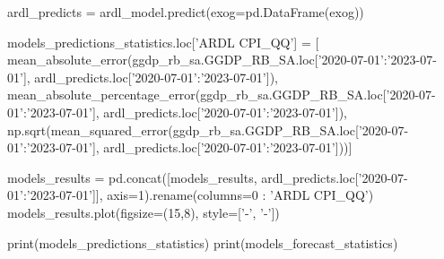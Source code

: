\documentclass[a4paper, 12pt]{extarticle}
\numberwithin{equation}{subsection}
\begin{document}
\begin{python}
		ardl_predicts = ardl_model.predict(exog=pd.DataFrame(exog))
		
		models_predictions_statistics.loc['ARDL CPI_QQ'] = [
		mean_absolute_error(ggdp_rb_sa.GGDP_RB_SA.loc['2020-07-01':'2023-07-01'], ardl_predicts.loc['2020-07-01':'2023-07-01']),
		mean_absolute_percentage_error(ggdp_rb_sa.GGDP_RB_SA.loc['2020-07-01':'2023-07-01'], ardl_predicts.loc['2020-07-01':'2023-07-01']),
		np.sqrt(mean_squared_error(ggdp_rb_sa.GGDP_RB_SA.loc['2020-07-01':'2023-07-01'], ardl_predicts.loc['2020-07-01':'2023-07-01']))]
		
		models_results = pd.concat([models_results, ardl_predicts.loc['2020-07-01':'2023-07-01']], axis=1).rename(columns={0 : 'ARDL CPI_QQ'})
		models_results.plot(figsize=(15,8), style=['-', '-'])
		
		print(models_predictions_statistics)
		print(models_forecast_statistics)\end{python}
\end{document}
